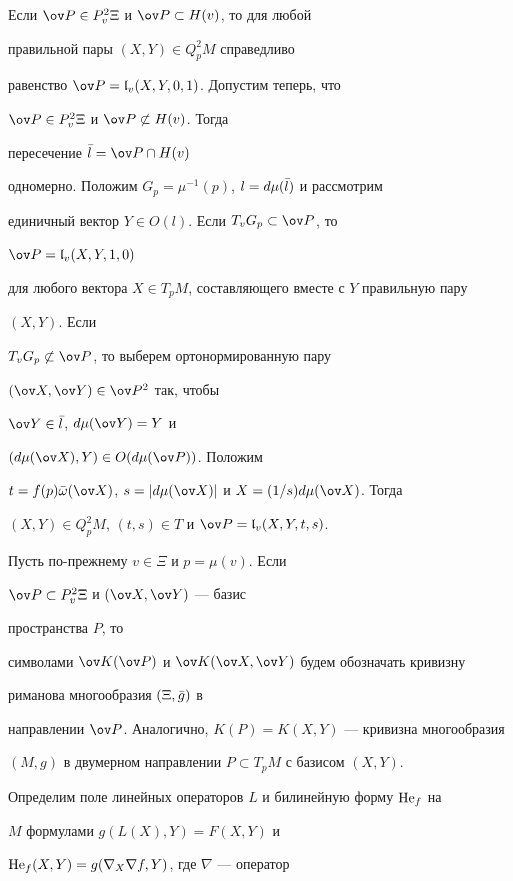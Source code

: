 \begin{pf} Если $\ov P\in P^2_v\Xi$ и $\ov P\subset H(v)$, то для любой 


правильной пары $(X,Y)\in Q^2_pM$ справедливо 


равенство $\ov P=\frak l_v(X,Y,0,1)$. Допустим теперь, что 


$\ov P\in P^2_v\Xi$ и $\ov P\not\subset H(v)$. Тогда 


пересечение $\Bar l=\ov P\cap H(v)$ 


одномерно. Положим $G_p=\mu^{-1}(p)$, $l=d\mu(\Bar l)$ и рассмотрим 


единичный вектор $Y\in O(l)$. Если $T_vG_p\subset \ov P$, то 


$\ov P=\frak l_v(X,Y,1,0)$ 


для любого вектора $X\in T_pM$, составляющего вместе с $Y$ правильную пару 


$(X,Y)$. Если 


$T_vG_p\not\subset\ov P$, то выберем ортонормированную пару 


$(\ov X,\ov Y)\in\ov P^2$ так, чтобы 


$\ov Y\in \Bar l$, $d\mu(\ov Y)=Y$ и 


$(d\mu(\ov X),Y)\in O(d\mu(\ov P))$. Положим 


$t=f(p)\Bar\omega(\ov X)$, $s=|d\mu(\ov X)|$ и $X=(1/s)d\mu(\ov X)$. Тогда 


$(X,Y)\in Q^2_pM$, $(t,s)\in T$ и $\ov P=\frak l_v(X,Y,t,s)$. 


\end{pf} 


 


Пусть по-прежнему $v\in \Xi$ и $p=\mu(v)$. Если 


$\ov P\subset P^2_v\Xi$ и $(\ov X,\ov Y)$ --- базис 


пространства $P$, то 


символами $\ov K(\ov P)$ и $\ov K(\ov X,\ov Y)$ будем обозначать кривизну 


риманова многообразия $(\Xi,\Bar g)$ в 


направлении $\ov P$. Аналогично, $K(P)=K(X,Y)$ --- кривизна многообразия 


$(M,g)$ в двумерном направлении $P\subset T_pM$ с базисом $(X,Y)$. 


Определим поле линейных операторов $L$ и билинейную форму $\operatorname{He}_f$ на 


$M$ формулами $g(L(X),Y)=F(X,Y)$ и 


$\operatorname{He}_f(X,Y)=g(\nabla_X\nabla f,Y)$, где $\nabla$ --- оператор 


